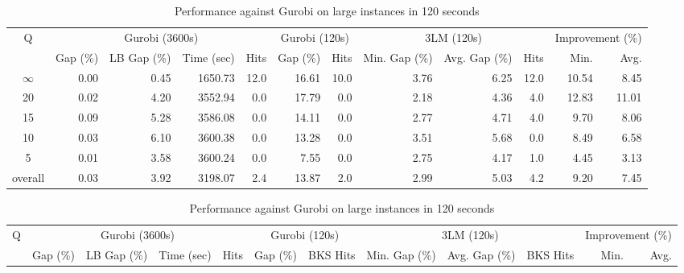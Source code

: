\begin{table}[H]
\centering
\caption{Performance against Gurobi on large instances in 120 seconds}
\label{tab:3lm_resuts200T120}
\begin{tabular}{c rrrr rr rrr rr}
\toprule
       Q & \multicolumn{4}{c}{Gurobi (3600s)} & \multicolumn{2}{c}{Gurobi (120s)} & \multicolumn{3}{c}{3LM (120s)} & \multicolumn{2}{c}{Improvement (\%)} \\
         &       Gap (\%) & LB Gap (\%) & Time (sec) & Hits &      Gap (\%) & Hits & Min. Gap (\%) & Avg. Gap (\%) & Hits &             Min. &  Avg. \\
\cmidrule(lr){1-1} \cmidrule(lr){2-5} \cmidrule(lr){2-5} \cmidrule(lr){6-7} \cmidrule(lr){8-10} \cmidrule(lr){11-12}
$\infty$ &           0.00 &        0.45 &    1650.73 & 12.0 &         16.61 & 10.0 &          3.76 &          6.25 & 12.0 &            10.54 &  8.45 \\
      20 &           0.02 &        4.20 &    3552.94 &  0.0 &         17.79 &  0.0 &          2.18 &          4.36 &  4.0 &            12.83 & 11.01 \\
      15 &           0.09 &        5.28 &    3586.08 &  0.0 &         14.11 &  0.0 &          2.77 &          4.71 &  4.0 &             9.70 &  8.06 \\
      10 &           0.03 &        6.10 &    3600.38 &  0.0 &         13.28 &  0.0 &          3.51 &          5.68 &  0.0 &             8.49 &  6.58 \\
       5 &           0.01 &        3.58 &    3600.24 &  0.0 &          7.55 &  0.0 &          2.75 &          4.17 &  1.0 &             4.45 &  3.13 \\
\midrule
 overall &           0.03 &        3.92 &    3198.07 &  2.4 &         13.87 &  2.0 &          2.99 &          5.03 &  4.2 &             9.20 &  7.45 \\
\bottomrule
\end{tabular}
\end{table}\begin{table}[H]
\centering
\caption{Performance against Gurobi on large instances in 120 seconds}
\label{tab:3lm_resuts200T120}
\begin{tabular}{c rrrr rr rrr rr}
\toprule
       Q & \multicolumn{4}{c}{Gurobi (3600s)} & \multicolumn{2}{c}{Gurobi (120s)} & \multicolumn{3}{c}{3LM (120s)} & \multicolumn{2}{c}{Improvement (\%)} \\
         &       Gap (\%) & LB Gap (\%) & Time (sec) & Hits &      Gap (\%) & BKS Hits & Min. Gap (\%) & Avg. Gap (\%) & BKS Hits &             Min. &  Avg. \\

\end{tabular}
\end{table}
